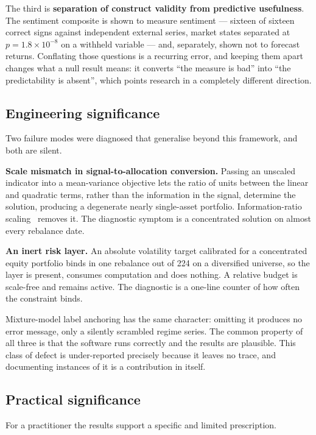 The third is \textbf{separation of construct validity from predictive usefulness}. The sentiment
composite is shown to measure sentiment --- sixteen of sixteen correct signs against independent
external series, market states separated at $p = 1.8\times10^{-8}$ on a withheld variable --- and,
separately, shown not to forecast returns. Conflating those questions is a recurring error, and
keeping them apart changes what a null result means: it converts ``the measure is bad'' into ``the
predictability is absent'', which points research in a completely different direction.

\subsection{Engineering significance}

Two failure modes were diagnosed that generalise beyond this framework, and both are silent.

\textbf{Scale mismatch in signal-to-allocation conversion.} Passing an unscaled indicator into a
mean-variance objective lets the ratio of units between the linear and quadratic terms, rather than
the information in the signal, determine the solution, producing a degenerate nearly single-asset
portfolio. Information-ratio scaling~\cite{grinold2000} removes it. The diagnostic symptom is a
concentrated solution on almost every rebalance date.

\textbf{An inert risk layer.} An absolute volatility target calibrated for a concentrated equity
portfolio binds in one rebalance out of 224 on a diversified universe, so the layer is present,
consumes computation and does nothing. A relative budget is scale-free and remains active. The
diagnostic is a one-line counter of how often the constraint binds.

Mixture-model label anchoring has the same character: omitting it produces no error message, only a
silently scrambled regime series. The common property of all three is that the software runs
correctly and the results are plausible. This class of defect is under-reported precisely because
it leaves no trace, and documenting instances of it is a contribution in itself.

\subsection{Practical significance}

For a practitioner the results support a specific and limited prescription.


